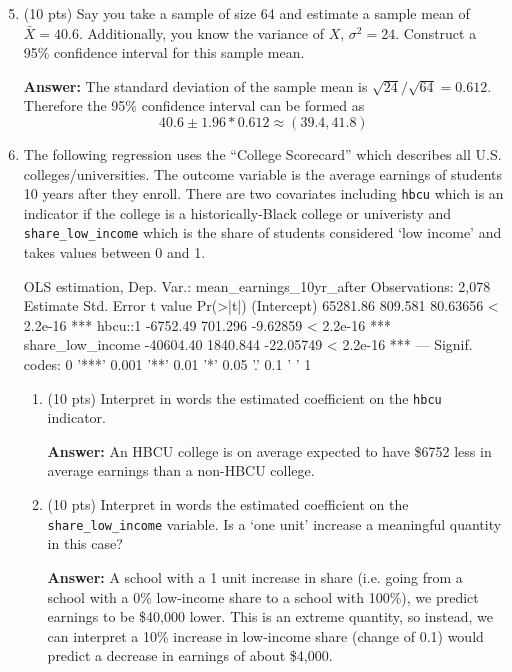 \documentclass[12pt]{article}
\newcommand{\answer}[1]{{\color{blue_winged_teal}\textbf{Answer:} #1}}
\newcommand{\pts}[1]{{\color{zinc500}(#1 pts)}}
\begin{document}
\bigskip
\begin{enumerate}
  \setcounter{enumi}{4}
  \item \pts{10} Say you take a sample of size 64 and estimate a sample mean of $\bar{X} = 40.6$. Additionally, you know the variance of $X$, $\sigma^2 = 24$. Construct a 95\% confidence interval for this sample mean. 
  
  \answer{
    The standard deviation of the sample mean is $\sqrt{24}/\sqrt{64} = 0.612$. Therefore the 95\% confidence interval can be formed as 
    $$
      40.6 \pm 1.96 * 0.612 \approx (39.4, 41.8)
    $$
  }

  \bigskip
  \item The following regression uses the ``College Scorecard'' which describes all U.S. colleges/universities. The outcome variable is the average earnings of students 10 years after they enroll. There are two covariates including \texttt{hbcu} which is an indicator if the college is a historically-Black college or univeristy and \texttt{share\_low\_income} which is the share of students considered `low income' and takes values between 0 and 1.
  \begin{codeblock}[{}]
OLS estimation, Dep. Var.: mean_earnings_10yr_after
Observations: 2,078
                  Estimate Std. Error   t value  Pr(>|t|)    
(Intercept)       65281.86    809.581  80.63656 < 2.2e-16 ***
hbcu::1           -6752.49    701.296  -9.62859 < 2.2e-16 ***
share_low_income -40604.40   1840.844 -22.05749 < 2.2e-16 ***
---
Signif. codes:  0 '***' 0.001 '**' 0.01 '*' 0.05 '.' 0.1 ' ' 1
  \end{codeblock}

  \begin{enumerate}[leftmargin = 2em]
    \item \pts{10} Interpret in words the estimated coefficient on the \texttt{hbcu} indicator. 
    
    \answer{
      An HBCU college is on average expected to have \$6752 less in average earnings than a non-HBCU college.
    }

    \item \pts{10} Interpret in words the estimated coefficient on the \texttt{share\_low\_income} variable. Is a `one unit' increase a meaningful quantity in this case?
    
    \answer{
      A school with a 1 unit increase in share (i.e. going from a school with a 0\% low-income share to a school with 100\%), we predict earnings to be \$40,000 lower. This is an extreme quantity, so instead, we can interpret a 10\% increase in low-income share (change of 0.1) would predict a decrease in earnings of about \$4,000.
    }
  \end{enumerate}
\end{enumerate}
\end{document}
